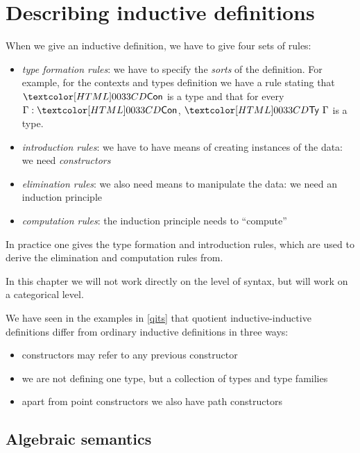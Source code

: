 \chapter{Describing inductive definitions}

When we give an inductive definition, we have to give four sets of
rules:
\begin{itemize}
\item \emph{type formation rules}: we have to specify the \emph{sorts}
  of the definition. For example, for the contexts and types
  definition we have a rule stating that $\ttconty$ is a type and that
  for every $\Gamma : \ttconty$, $\tttyty\ \Gamma$ is a type.
\item \emph{introduction rules}: we have to have means of creating
  instances of the data: we need \emph{constructors}
\item \emph{elimination rules}: we also need means to manipulate the
  data: we need an induction principle
\item \emph{computation rules}: the induction principle needs to ``compute''
\end{itemize}

In practice one gives the type formation and introduction rules, which
are used to derive the elimination and computation rules from.

In this chapter we will not work directly on the level of syntax, but
will work on a categorical level.

We have seen in the examples in \cref{qits} that quotient
inductive-inductive definitions differ from ordinary inductive
definitions in three ways:
%
\begin{itemize}
\item constructors may refer to any previous constructor
\item we are not defining one type, but a collection of types and type
  families
\item apart from point constructors we also have path constructors
\end{itemize}

\section{Algebraic semantics}

